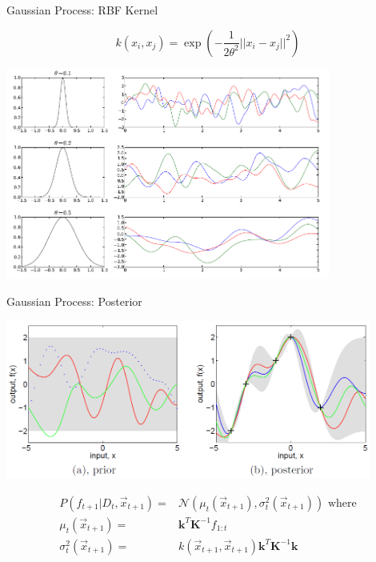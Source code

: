 \begin{frame}[c]{Gaussian Process: RBF Kernel}

\begin{equation}
k(x_i,x_j) = \exp \left(- \frac{1}{2\theta^2} || x_i - x_j ||^2 \right) \nonumber
\end{equation}

\centering
\includegraphics[width=0.8\textwidth]{images/gp_rbf_kernel.png}

\end{frame}
\begin{frame}[c]{Gaussian Process: Posterior}

\centering
\includegraphics[width=0.9\textwidth]{images/gp_postrior.png}


\begin{eqnarray}
P(f_{t+1} | D_t, \vec{x}_{t+1})  =& \mathcal{N}(\mu_t(\vec{x}_{t+1}),\sigma_t^2(\vec{x}_{t+1})) \text{ where} \nonumber\\ 
\mu_t(\vec{x}_{t+1})  =& \mathbf{k}^T\mathbf{K}^{-1}f_{1:t} \nonumber \\ 
\sigma_t^2(\vec{x}_{t+1}) =& k(\vec{x}_{t+1},\vec{x}_{t+1}) \nonumber \mathbf{k}^T\mathbf{K}^{-1}\mathbf{k}
\end{eqnarray}

\end{frame}
